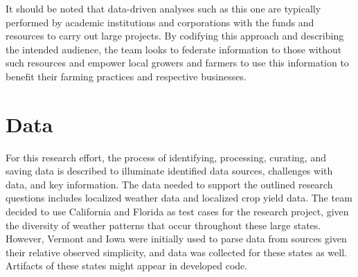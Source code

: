 \documentclass{article}
\begin{document}

It should be noted that data-driven analyses such as this one are typically performed by academic institutions and corporations with the funds and resources to carry out large projects. By codifying this approach and describing the intended audience, the team looks to federate information to those without such resources and empower local growers and farmers to use this information to benefit their farming practices and respective businesses. 

\section{Data}
\hspace{.5cm}For this research effort, the process of identifying, processing, curating, and saving data is described to illuminate identified data sources, challenges with data, and key information. The data needed to support the outlined research questions includes localized weather data and localized crop yield data. The team decided to use California and Florida as test cases for the research project, given the diversity of weather patterns that occur throughout these large states. However, Vermont and Iowa were initially used to parse data from sources given their relative observed simplicity, and data was collected for these states as well. Artifacts of these states might appear in developed code. 
\end{document}

